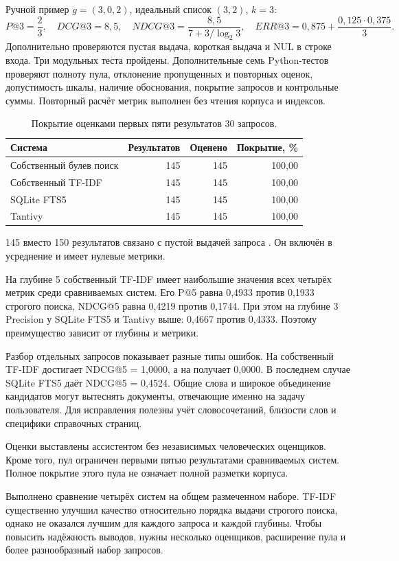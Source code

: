 \testing
Ручной пример \(g=(3,0,2)\), идеальный список \((3,2)\), \(k=3\):
\[
P@3=\frac23,\quad DCG@3=8{,}5,\quad
NDCG@3=\frac{8{,}5}{7+3/\log_2 3},\quad
ERR@3=0{,}875+\frac{0{,}125\cdot0{,}375}{3}.
\]
Дополнительно проверяются пустая выдача, короткая выдача и NUL
в строке входа. Три модульных теста пройдены.
Дополнительные семь Python-тестов проверяют полноту пула,
отклонение пропущенных и повторных оценок, допустимость шкалы,
наличие обоснования, покрытие запросов и контрольные суммы.
Повторный расчёт метрик выполнен без чтения корпуса и индексов.

\results
\begin{table}[H]\centering
\begin{tabular}{lrrr}\toprule
Система & Результатов & Оценено & Покрытие, \%\\\midrule
Собственный булев поиск & 145 & 145 & 100,00\\
Собственный TF-IDF & 145 & 145 & 100,00\\
SQLite FTS5 & 145 & 145 & 100,00\\
Tantivy & 145 & 145 & 100,00\\\bottomrule
\end{tabular}
\caption{Покрытие оценками первых пяти результатов 30 запросов.}
\end{table}
145 вместо 150 результатов связано с пустой выдачей запроса
. Он включён в усреднение и имеет нулевые метрики.

На глубине 5 собственный TF-IDF имеет наибольшие значения всех
четырёх метрик среди сравниваемых систем. Его P@5 равна 0,4933
против 0,1933 строгого поиска, NDCG@5 равна 0,4219 против 0,1744.
При этом на глубине 3 Precision у SQLite FTS5 и Tantivy выше:
0,4667 против 0,4333. Поэтому преимущество зависит от глубины и метрики.

Разбор отдельных запросов показывает разные типы ошибок.
На  собственный TF-IDF достигает NDCG@5 = 1,0000,
а на  получает 0,0000. В последнем случае
SQLite FTS5 даёт NDCG@5 = 0,4524. Общие слова и широкое объединение
кандидатов могут вытеснять документы, отвечающие именно на задачу
пользователя. Для исправления полезны учёт словосочетаний,
близости слов и специфики справочных страниц.

Оценки выставлены ассистентом без независимых человеческих оценщиков.
Кроме того, пул ограничен первыми пятью результатами сравниваемых
систем. Полное покрытие этого пула не означает полной разметки корпуса.

\conclusions
Выполнено сравнение четырёх систем на общем размеченном наборе.
TF-IDF существенно улучшил качество относительно порядка выдачи
строгого поиска, однако не оказался лучшим для каждого запроса
и каждой глубины. Чтобы повысить надёжность выводов, нужны
несколько оценщиков, расширение пула и более разнообразный набор запросов.
